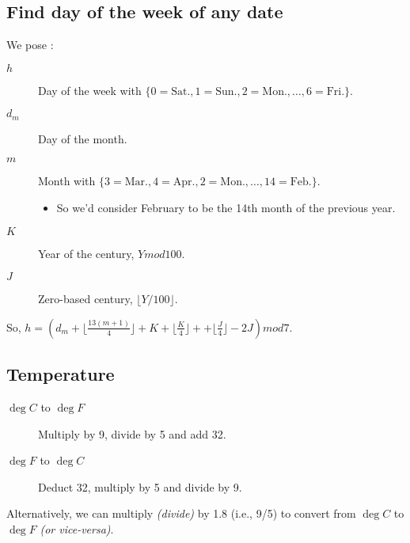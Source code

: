 \documentclass[10pt, french]{article}
\begin{document}
\begin{multicols*}{3}
\subsection{Find day of the week of any date}
We pose : 
\begin{description}
	\item[$h$]	Day of the week with $\{0 = \text{Sat.}, 1 = \text{Sun.}, 2 = \text{Mon.}, \dots, 6 = \text{Fri.}\}$.
	\item[$d_{m}$]	Day of the month.
	\item[$m$]	Month with $\{3 = \text{Mar.}, 4 = \text{Apr.}, 2 = \text{Mon.}, \dots, 14 = \text{Feb.}\}$.
		\begin{itemize}
		\item	So we'd consider February to be the 14th month of the previous year.
		\end{itemize}
	\item[$K$]	Year of the century, $Y mod 100$.
	\item[$J$]	Zero-based century, $\lfloor Y / 100\rfloor$.
\end{description}

So, $h	=	\left(d_{m} + \lfloor \frac{13(m + 1)}{4} \rfloor + K + \lfloor \frac{K}{4} \rfloor +  + \lfloor \frac{J}{4} \rfloor - 2J\right) mod 7$.

\subsection{Temperature}
\begin{description}
	\item[$\deg C$ to $\deg F$]	Multiply by 9, divide by 5 and add 32.
	\item[$\deg F$ to $\deg C$]	Deduct 32, multiply by 5 and divide by 9.
\end{description}
Alternatively, we can multiply \textit{(divide)} by 1.8 (i.e.,  9/5) to convert from $\deg C$ to $\deg F$ \textit{(or vice-versa)}.

\end{multicols*}
\end{document}
